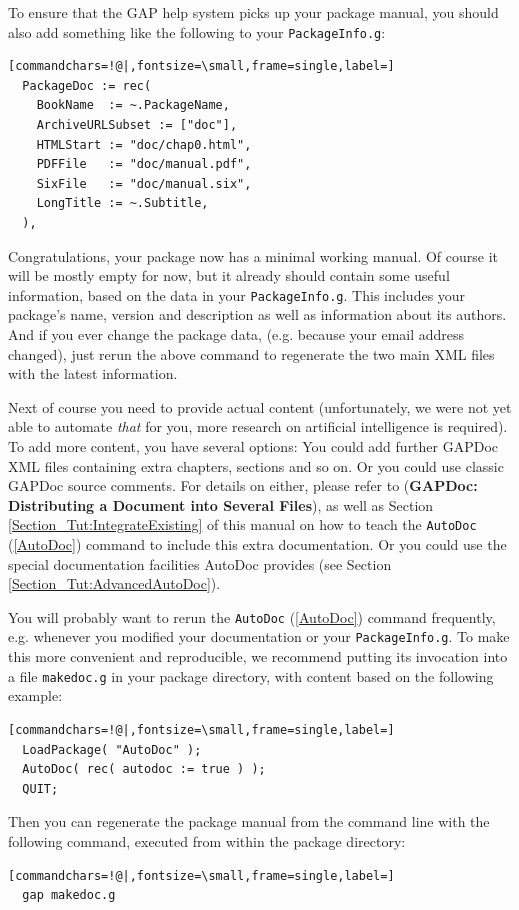 \documentclass[a4paper,11pt]{report}
\begin{document}
{{ To ensure that the \textsf{GAP} help system picks up your package manual, you should also add something like
the following to your \texttt{PackageInfo.g}: 
\begin{Verbatim}[commandchars=!@|,fontsize=\small,frame=single,label=]
  PackageDoc := rec(
    BookName  := ~.PackageName,
    ArchiveURLSubset := ["doc"],
    HTMLStart := "doc/chap0.html",
    PDFFile   := "doc/manual.pdf",
    SixFile   := "doc/manual.six",
    LongTitle := ~.Subtitle,
  ),
\end{Verbatim}
 

 Congratulations, your package now has a minimal working manual. Of course it
will be mostly empty for now, but it already should contain some useful
information, based on the data in your \texttt{PackageInfo.g}. This includes your package's name, version and description as well as
information about its authors. And if you ever change the package data, (e.g.
because your email address changed), just re\texttt{}run the above
command to regenerate the two main XML files with the latest information. 

 Next of course you need to provide actual content (unfortunately, we were not
yet able to automate \emph{that} for you, more research on artificial intelligence is required). To add more
content, you have several options: You could add further \textsf{GAPDoc} XML files containing extra chapters, sections and so on. Or you could use
classic \textsf{GAPDoc} source comments. For details on either, please refer to  (\textbf{GAPDoc: Distributing a Document into Several Files}), as well as Section \ref{Section_Tut:IntegrateExisting} of this manual on how to teach the \texttt{AutoDoc} (\ref{AutoDoc}) command to include this extra documentation. Or you could use the special
documentation facilities \textsf{AutoDoc} provides (see Section \ref{Section_Tut:AdvancedAutoDoc}). 

 You will probably want to re\texttt{}run the \texttt{AutoDoc} (\ref{AutoDoc}) command frequently, e.g. whenever you modified your documentation or your \texttt{PackageInfo.g}. To make this more convenient and reproducible, we recommend putting its
invocation into a file \texttt{makedoc.g} in your package  directory, with content based on the following example: 
\begin{Verbatim}[commandchars=!@|,fontsize=\small,frame=single,label=]
  LoadPackage( "AutoDoc" );
  AutoDoc( rec( autodoc := true ) );
  QUIT;
\end{Verbatim}
 Then you can regenerate the package manual from the command line with the
following command, executed from within the package directory: 
\begin{Verbatim}[commandchars=!@|,fontsize=\small,frame=single,label=]
  gap makedoc.g
\end{Verbatim}
 

}}
\end{document}
